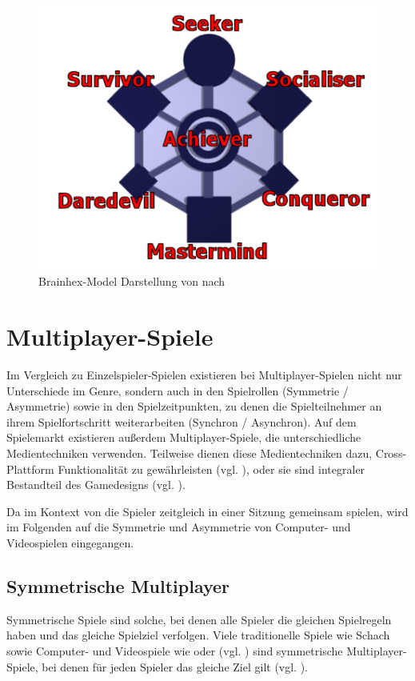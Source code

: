 \begin{figure}[ht]
\centering
\includegraphics[width=1\linewidth]{content/pictures/brainhex-classes.png}
\caption{Brainhex-Model Darstellung von \citealp{noauthor_i_nodate} nach \citealp{nacke_brainhex_2013}}
\label{fig:brain-hex}
\end{figure}

\section{Multiplayer-Spiele}
Im Vergleich zu Einzelspieler-Spielen existieren bei Multiplayer-Spielen nicht nur Unterschiede im Genre, sondern auch in den Spielrollen (Symmetrie / Asymmetrie) sowie in den Spielzeitpunkten, zu denen die Spielteilnehmer an ihrem Spielfortschritt weiterarbeiten (Synchron / Asynchron). Auf dem Spielemarkt existieren außerdem Multiplayer-Spiele, die unterschiedliche Medientechniken verwenden. Teilweise dienen diese Medientechniken dazu, Cross-Plattform Funktionalität zu gewährleisten (vgl. \citealp{larian_studios_baldurs_2023}), oder sie sind integraler Bestandteil des Gamedesigns (vgl. \citealp{steel_crate_games_keep_2015}).

Da im Kontext von  die Spieler zeitgleich in einer Sitzung gemeinsam spielen, wird im Folgenden auf die Symmetrie und Asymmetrie von Computer- und Videospielen eingegangen.

\subsection{Symmetrische Multiplayer}
Symmetrische Spiele sind solche, bei denen alle Spieler die gleichen Spielregeln haben und das gleiche Spielziel verfolgen. Viele traditionelle Spiele wie Schach sowie Computer- und Videospiele wie  oder  (vgl. \citealp{nintendo_mario_1992, mojang_willkommen_2009}) sind symmetrische Multiplayer-Spiele, bei denen für jeden Spieler das gleiche Ziel gilt (vgl. \citealp[S. 12]{adams_fundamentals_2013}).

